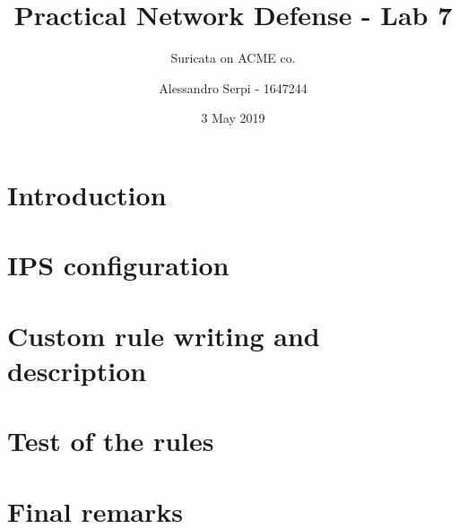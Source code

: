 \documentclass[draft]{homework}
\title{Practical Network Defense - Lab 7}
\subtitle{Suricata on ACME co.}
\author{Alessandro Serpi - 1647244}
\date{3 May 2019}
\begin{document}
    \maketitle
    \tableofcontents
    
    
    \pagebreak
    \section{Introduction}
    
    
    \section{IPS configuration}
    
    
    \section{Custom rule writing and description}
    
    
    \section{Test of the rules}
    
    
    \section{Final remarks}
\end{document}
